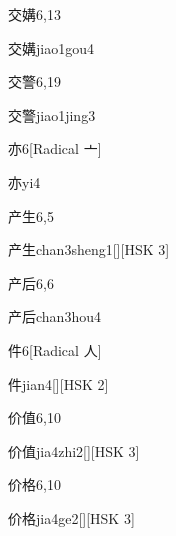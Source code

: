 \begin{entry}{交媾}{6,13}
  \begin{phonetics}{交媾}{jiao1gou4}
  \end{phonetics}
\end{entry}

\begin{entry}{交警}{6,19}
  \begin{phonetics}{交警}{jiao1jing3}
  \end{phonetics}
\end{entry}

\begin{entry}{亦}{6}[Radical 亠]
  \begin{phonetics}{亦}{yi4}
  \end{phonetics}
\end{entry}

\begin{entry}{产生}{6,5}
  \begin{phonetics}{产生}{chan3sheng1}[][HSK 3]
  \end{phonetics}
\end{entry}

\begin{entry}{产后}{6,6}
  \begin{phonetics}{产后}{chan3hou4}
  \end{phonetics}
\end{entry}

\begin{entry}{件}{6}[Radical 人]
  \begin{phonetics}{件}{jian4}[][HSK 2]
  \end{phonetics}
\end{entry}

\begin{entry}{价值}{6,10}
  \begin{phonetics}{价值}{jia4zhi2}[][HSK 3]
  \end{phonetics}
\end{entry}

\begin{entry}{价格}{6,10}
  \begin{phonetics}{价格}{jia4ge2}[][HSK 3]
  \end{phonetics}
\end{entry}

